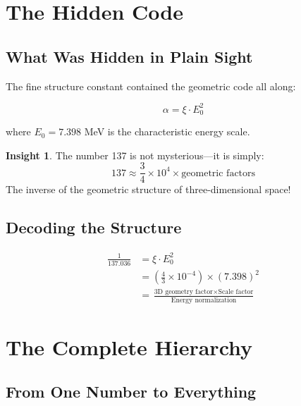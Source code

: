 \documentclass[12pt,a4paper]{article}
\theoremstyle{definition}
\newtheorem{insight}{Insight}[section]
\begin{document}
	\section{The Hidden Code}
	
	\subsection{What Was Hidden in Plain Sight}
	
	The fine structure constant contained the geometric code all along:
	
	\begin{equation}
		\alpha = \xi \cdot E_0^2
	\end{equation}
	
	where $E_0 = 7.398$ MeV is the characteristic energy scale.
	
	\begin{insight}
		The number 137 is not mysterious---it is simply:
		\begin{equation}
			137 \approx \frac{3}{4} \times 10^4 \times \text{geometric factors}
		\end{equation}
		The inverse of the geometric structure of three-dimensional space!
	\end{insight}
	
	\subsection{Decoding the Structure}
	
	\begin{fundamental}
		\begin{align}
			\frac{1}{137.036} &= \xi \cdot E_0^2\\
			&= \left(\frac{4}{3} \times 10^{-4}\right) \times (7.398)^2\\
			&= \frac{\text{3D geometry factor} \times \text{Scale factor}}{\text{Energy normalization}}
		\end{align}
	\end{fundamental}
	
	\section{The Complete Hierarchy}
	
	\subsection{From One Number to Everything}
	
\end{document}

